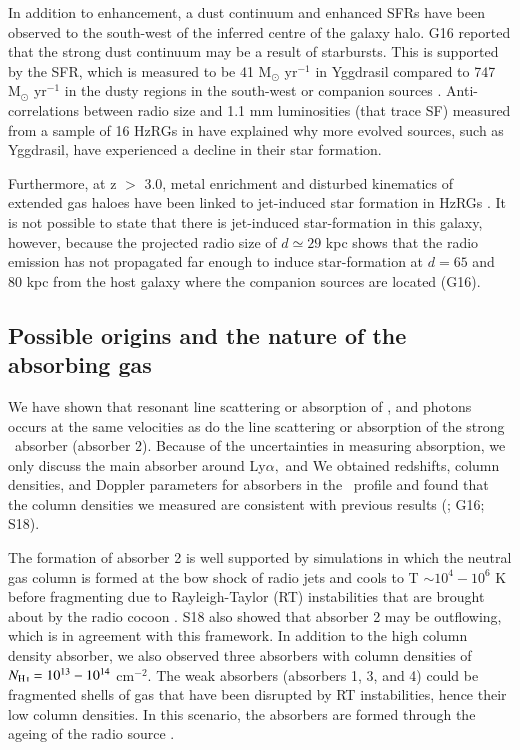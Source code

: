 In addition to  enhancement, a dust continuum and enhanced SFRs have been observed to the south-west of the inferred centre of the galaxy halo. G16 reported that the strong dust continuum may be a result of starbursts. This is supported by the SFR, which is measured to be  41 M$_\odot$ yr$^{-1}$  in Yggdrasil compared to  747 M$_\odot$ yr$^{-1} $ in the dusty regions in the south-west or companion sources \citep{falkendal2019}. Anti-correlations between radio size and 1.1 mm luminosities (that trace SF) measured from a sample of 16 HzRGs in \citet{humphrey2011} have explained why more evolved sources, such as Yggdrasil, have experienced a decline in their star formation. 

Furthermore, at z $>$ 3.0, metal enrichment and disturbed kinematics of extended gas haloes have been linked to jet-induced star formation in HzRGs \citep[e.g.][]{reuland2007}. It is not possible to state that there is jet-induced star-formation in this galaxy, however, because the projected radio size of $d \simeq 29$ kpc shows that the radio emission has not propagated far enough to induce star-formation at $d=65$ and 80 kpc from the host galaxy where the companion sources are located (G16).

\subsection{Possible origins and the nature of the absorbing gas}

We have shown that resonant line scattering or absorption of ,  and  photons occurs at the same velocities as do the line scattering or absorption of the strong \lya~absorber (absorber 2). Because of the uncertainties in measuring  absorption, we only discuss the main absorber around Ly$\alpha,$  and   We obtained redshifts, column densities, and Doppler parameters for absorbers in the \lya~profile and found that the  column densities we measured are consistent with previous results (\citealp{vanojik1997,jarvis2003,wilman2004}; G16; S18). 

The formation of absorber 2 is well supported by simulations in which the neutral gas column is formed at the bow shock of radio jets and cools to T $\sim10^4-10^6$ K before fragmenting due to Rayleigh-Taylor (RT) instabilities that are brought about by the radio cocoon \citep{krause2002,krause2005}. S18 also showed that absorber 2 may be outflowing, which is in agreement with this framework. In addition to the high column density absorber, we also observed three  absorbers with column densities of $N_\ion{H}{I} = 10^{13}-10^{14}$ cm$^{-2}.$ The weak absorbers (absorbers 1, 3, and 4) could be fragmented shells of gas that have been disrupted by RT instabilities, hence their low column densities. In this scenario, the absorbers are formed through the ageing of the radio source \citep{wilman2004,binette2006}. 

